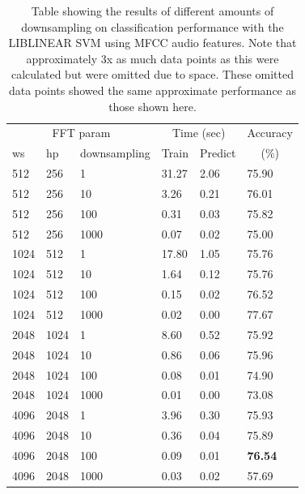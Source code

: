\documentclass[12pt,oneside]{book}
\begin{document}
\begin{table}
\begin{tabular}{|l|l|l|l|l|l|}
\hline
\multicolumn{3}{|c|}{FFT param} & \multicolumn{2}{c|}{Time (sec)} & Accuracy \\
\hhline{|-|-|-|-|-|~|}
ws & hp & downsampling & Train & Predict & \multicolumn{1}{c|}{(\%)} \\
\hhline{|=|=|=|=|=|=|}
512 & 256 & 1       &    31.27  &  2.06  &  75.90  \\
512 & 256 & 10      &     3.26  &  0.21  &  76.01  \\
512 & 256 & 100     &     0.31  &  0.03  &  75.82  \\
512 & 256 & 1000    &     0.07  &  0.02  &  75.00  \\
1024 & 512 & 1      &    17.80  &  1.05  &  75.76  \\
1024 & 512 & 10     &     1.64  &  0.12  &  75.76  \\
1024 & 512 & 100    &     0.15  &  0.02  &  76.52  \\
1024 & 512 & 1000   &     0.02  &  0.00  &  77.67  \\
\hline
2048 & 1024 & 1     &     8.60  &  0.52  &  75.92  \\
2048 & 1024 & 10    &     0.86  &  0.06  &  75.96  \\
2048 & 1024 & 100   &     0.08  &  0.01  &  74.90  \\
2048 & 1024 & 1000  &     0.01  &  0.00  &  73.08  \\
4096 & 2048 & 1     &     3.96  &  0.30  &  75.93  \\
4096 & 2048 & 10    &     0.36  &  0.04  &  75.89  \\
4096 & 2048 & 100   &     0.09  &  0.01  &  \textbf{76.54}  \\
4096 & 2048 & 1000  &     0.03  &  0.02  &  57.69  \\
\hline
\end{tabular}
\caption{Table showing the results of different amounts of
  downsampling on classification performance with the LIBLINEAR SVM
  using MFCC audio features.  Note that approximately 3x as
  much data points as this were calculated but were omitted due to
  space.  These omitted data points showed the same approximate
  performance as those shown here.}
\label{table:obv-downsampling}
\end{table}
\end{document}
